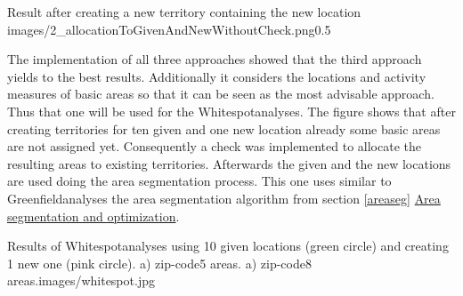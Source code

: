 \begin{figurevarSize}{Result after creating a new territory containing the new location }{images/2_allocationToGivenAndNewWithoutCheck.png}{0.5}\end{figurevarSize}

The implementation of all three approaches showed that the third approach yields to the best results. Additionally it considers the locations and activity measures of basic areas so that it can be seen as the most advisable approach. Thus that one will be used for the Whitespotanalyses. The figure shows that after creating territories for ten given and one new location already some basic areas are not assigned yet. Consequently a check was implemented to allocate the resulting areas to existing territories. Afterwards the given and the new locations are used doing the area segmentation process. This one uses similar to Greenfieldanalyses the area segmentation algorithm from section \ref{areaseg} \hyperref[areaseg]{Area segmentation and optimization}.

\begin{figureOwn}{Results of Whitespotanalyses using 10 given locations (green circle) and creating 1 new one (pink circle). a) zip-code5 areas. a) zip-code8 areas.}{images/whitespot.jpg}\end{figureOwn}

